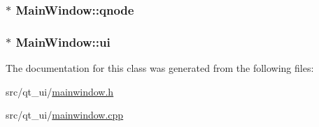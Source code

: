 \subsubsection[{\texorpdfstring{qnode}{qnode}}]{$\ast$ Main\+Window\+::qnode\hspace{0.3cm}{\ttfamily [private]}}\hypertarget{class_main_window_ac9d45be6e40fe6917339119e15c1b120}{}\label{class_main_window_ac9d45be6e40fe6917339119e15c1b120}
\subsubsection[{\texorpdfstring{ui}{ui}}]{$\ast$ Main\+Window\+::ui\hspace{0.3cm}{\ttfamily [private]}}\hypertarget{class_main_window_a35466a70ed47252a0191168126a352a5}{}\label{class_main_window_a35466a70ed47252a0191168126a352a5}


The documentation for this class was generated from the following files\+:\begin{DoxyCompactItemize}
\item 
src/qt\+\_\+ui/\hyperlink{mainwindow_8h}{mainwindow.\+h}\item 
src/qt\+\_\+ui/\hyperlink{mainwindow_8cpp}{mainwindow.\+cpp}\end{DoxyCompactItemize}
